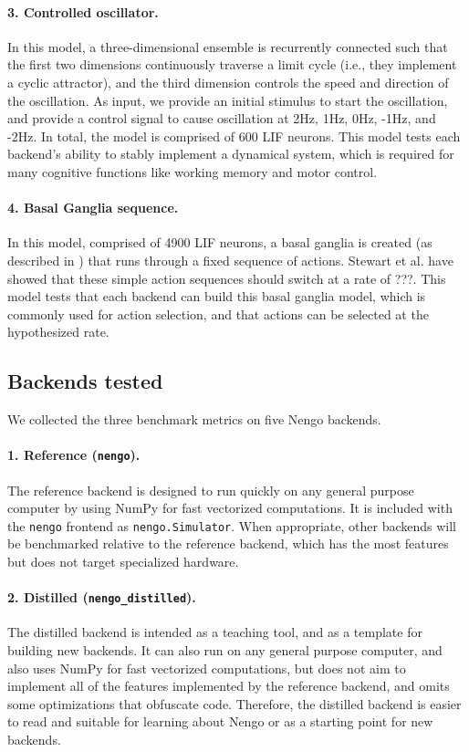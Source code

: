 \documentclass{frontiersSCNS}
\begin{document}
\paragraph{3. Controlled oscillator.}
In this model,
a three-dimensional ensemble is recurrently connected
such that the first two dimensions continuously
traverse a limit cycle
(i.e., they implement a cyclic attractor),
and the third dimension controls the speed
and direction of the oscillation.
As input, we provide an initial stimulus
to start the oscillation,
and provide a control signal
to cause oscillation at
2Hz, 1Hz, 0Hz, -1Hz, and -2Hz.
In total, the model is comprised of 600 LIF neurons.
This model tests each backend's ability
to stably implement a dynamical system,
which is required for many cognitive functions
like working memory and motor control.

\paragraph{4. Basal Ganglia sequence.}
In this model, comprised of 4900 LIF neurons,
a basal ganglia is created (as described in \cite{???})
that runs through a fixed sequence of actions.
Stewart et al. \cite{???} have showed that
these simple action sequences should
switch at a rate of ???.
This model tests that each backend can
build this basal ganglia model,
which is commonly used for action selection,
and that actions can be selected at the
hypothesized rate.

\subsection{Backends tested}

We collected the three benchmark metrics
on five Nengo backends.

\paragraph{1. Reference (\texttt{nengo}).}
The reference backend is designed to run quickly
on any general purpose computer
by using NumPy \cite{???}
for fast vectorized computations.
It is included with the \texttt{nengo} frontend
as \texttt{nengo.Simulator}.
When appropriate, other backends will be benchmarked
relative to the reference backend,
which has the most features but does not target
specialized hardware.

\paragraph{2. Distilled (\texttt{nengo\_distilled}).}
The distilled backend is intended as a teaching tool,
and as a template for building new backends.
It can also run on any general purpose computer,
and also uses NumPy for fast vectorized computations,
but does not aim to implement all of the features
implemented by the reference backend,
and omits some optimizations that obfuscate code.
Therefore, the distilled backend is easier to read
and suitable for learning about Nengo
or as a starting point for new backends.
\end{document}
